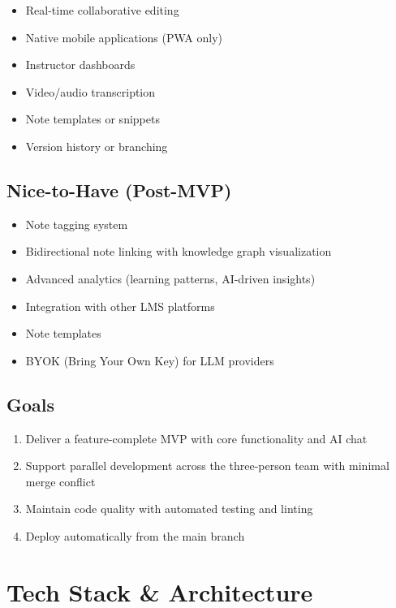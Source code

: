\documentclass[12pt,a4paper]{article}
\begin{document}
\begin{itemize}
    \item Real-time collaborative editing
    \item Native mobile applications (PWA only)
    \item Instructor dashboards
    \item Video/audio transcription
    \item Note templates or snippets
    \item Version history or branching
\end{itemize}

\subsection{Nice-to-Have (Post-MVP)}

\begin{itemize}
    \item Note tagging system
    \item Bidirectional note linking with knowledge graph visualization
    \item Advanced analytics (learning patterns, AI-driven insights)
    \item Integration with other LMS platforms
    \item Note templates
    \item BYOK (Bring Your Own Key) for LLM providers
\end{itemize}

\subsection{Goals}

\begin{enumerate}
    \item Deliver a feature-complete MVP with core functionality and AI chat
    \item Support parallel development across the three-person team with minimal merge conflict
    \item Maintain code quality with automated testing and linting
    \item Deploy automatically from the main branch
\end{enumerate}

\section{Tech Stack \& Architecture}
\end{document}
